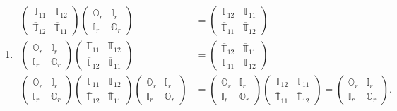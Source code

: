 \documentclass[aps, preprint]{revtex4}
\begin{document}
\begin{enumerate}
\item
\begin{align}\left (\begin{array}{cc}\mathbb{T}_{1 1} & \mathbb{T}_{1 2} \\
\overline{\mathbb{T}}_{1 2} & \overline{\mathbb{T}}_{1 1}\end{array}\right ) \left (\begin{array}{cc}\mathbb{O}_{r} & \mathbb{I}_{r} \\
\mathbb{I}_{r} & \mathbb{O}_{r}\end{array}\right ) &  =\left (\begin{array}{cc}\mathbb{T}_{1 2} & \mathbb{T}_{1 1} \\
\overline{\mathbb{T}}_{1 1} & \overline{\mathbb{T}}_{1 2}\end{array}\right ) \\
\left (\begin{array}{cc}\mathbb{O}_{r} & \mathbb{I}_{r} \\
\mathbb{I}_{r} & \mathbb{O}_{r}\end{array}\right ) \left (\begin{array}{cc}\mathbb{T}_{1 1} & \mathbb{T}_{1 2} \\
\overline{\mathbb{T}}_{1 2} & \overline{\mathbb{T}}_{1 1}\end{array}\right ) &  =\left (\begin{array}{cc}\overline{\mathbb{T}}_{1 2} & \overline{\mathbb{T}}_{1 1} \\
\mathbb{T}_{1 1} & \mathbb{T}_{1 2}\end{array}\right ) \\
\left (\begin{array}{cc}\mathbb{O}_{r} & \mathbb{I}_{r} \\
\mathbb{I}_{r} & \mathbb{O}_{r}\end{array}\right ) \left (\begin{array}{cc}\mathbb{T}_{1 1} & \mathbb{T}_{1 2} \\
\overline{\mathbb{T}}_{1 2} & \overline{\mathbb{T}}_{1 1}\end{array}\right ) \left (\begin{array}{cc}\mathbb{O}_{r} & \mathbb{I}_{r} \\
\mathbb{I}_{r} & \mathbb{O}_{r}\end{array}\right ) &  =\left (\begin{array}{cc}\mathbb{O}_{r} & \mathbb{I}_{r} \\
\mathbb{I}_{r} & \mathbb{O}_{r}\end{array}\right ) \left (\begin{array}{cc}\mathbb{T}_{1 2} & \mathbb{T}_{1 1} \\
\overline{\mathbb{T}}_{1 1} & \overline{\mathbb{T}}_{1 2}\end{array}\right ) =\left (\begin{array}{cc}\mathbb{O}_{r} & \mathbb{I}_{r} \\
\mathbb{I}_{r} & \mathbb{O}_{r}\end{array}\right )\text{.}\end{align}


\end{enumerate}
\end{document}
